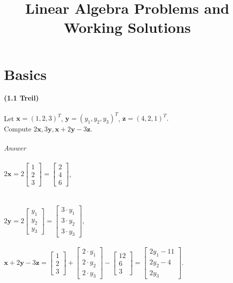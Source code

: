 \documentclass{book}
\title{Linear Algebra Problems and Working Solutions}
\date{}
\renewcommand{\vec}[1]{\mathbf{#1}}
\begin{document}
	\maketitle
	\chapter{Basics}
	
	\textbf{(1.1 Treil)}
	\\\\
	Let $\vec{x} = (1,2,3)^T$,
	$\vec{y} = (y_1,y_2,y_3)^T$, 
	$\vec{z} = (4,2,1)^T.$ 
	\\
	Compute $2\vec{x}, 3\vec{y}, \vec{x}+2\vec{y}-3\vec{z}.$  	
	\\\\
	\textit{Answer}\\\\
	
	$
	2\vec{x}=2 
	\begin{bmatrix}
	1\\2\\3
	\end{bmatrix}
	= \begin{bmatrix}
	2\\4\\6
	\end{bmatrix}
	$,\\\\\\
	
	$
	2\vec{y}=2 
	\begin{bmatrix}
	y_1\\y_2\\y_3
	\end{bmatrix}
	= \begin{bmatrix}
	3\cdot y_1\\3\cdot y_2\\3\cdot y_3
	\end{bmatrix}
	$,\\\\
	
	$
	\vec{x}+2\vec{y}-3\vec{z}= 
	\begin{bmatrix}
	1\\2\\3
	\end{bmatrix}+
	\begin{bmatrix}
	2\cdot y_1\\2\cdot y_2\\2\cdot y_3
	\end{bmatrix}-
	\begin{bmatrix}
	12\\6\\3
	\end{bmatrix}=
	\begin{bmatrix}
	2y_1-11\\2y_2-4\\2y_3
	\end{bmatrix}
	$.\\
	\\\\
	
	\textbf{\\
	}
	
		
	
	
\end{document}
